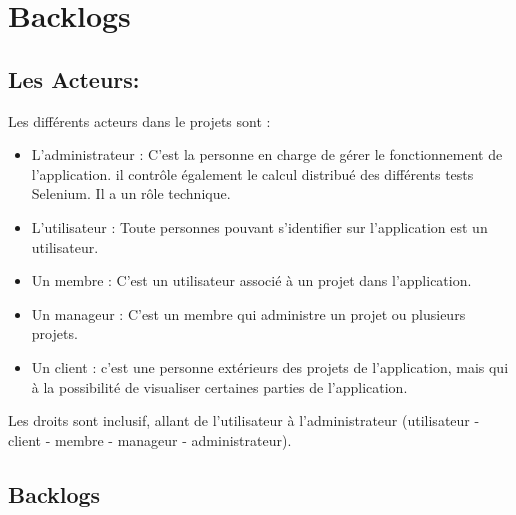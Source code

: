 \section{Backlogs}

	\subsection{Les Acteurs:}
		 Les différents acteurs dans le projets sont :
		 \begin{itemize}
		 		\item L'administrateur : C'est la personne en charge de gérer le fonctionnement de l'application. 
		 		il contrôle également le calcul distribué des différents tests Selenium. Il a un rôle technique.
		 		
		 		\item L'utilisateur :  Toute personnes pouvant s'identifier sur l'application est un utilisateur.
		 		
		 		\item Un membre : C'est un utilisateur associé à un projet dans l'application.
		 		
		 		\item Un manageur : C'est un membre qui administre un projet ou plusieurs projets.
		 		
		 		\item Un client : c'est une personne extérieurs des projets de l'application, mais qui à la possibilité de 
		 											visualiser certaines parties de l'application.
		 \end{itemize}

			Les droits sont inclusif, allant de l'utilisateur à l'administrateur (utilisateur - client - membre - manageur - administrateur).

	\subsection{Backlogs}
	

